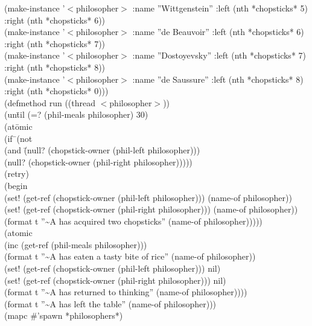 \documentclass[10pt]{book}
\newenvironment{lisp}{\begin{ttfamily}\begin{tabbing}}{\par\end{tabbing}\end{ttfamily}}
\begin{document}
\begin{lisp}
\>  (make-instance '$<$philosopher$>$ :name ''Wittgenstein'' :left (nth *chopsticks* 5) :right (nth *chopsticks* 6))\\
\>  (make-instance '$<$philosopher$>$ :name ''de Beauvoir'' :left (nth *chopsticks* 6) :right (nth *chopsticks* 7))\\
\>  (make-instance '$<$philosopher$>$ :name  ''Dostoyevsky'' :left (nth *chopsticks* 7) :right (nth *chopsticks* 8))\\ 
\>  (make-instance '$<$philosopher$>$ :name ''de Saussure'' :left (nth *chopsticks* 8) :right (nth *chopsticks* 0)))\\
(defmethod run ((thread $<$philosopher$>$))\\
\> (un\= til (=? (phil-meals philosopher) 30)\\ %
\> \> (at\= omic \\
\> \> \> (if\=\ (not \\
\> \> \> \> (and \= (null? (chopstick-owner (phil-left philosopher))) \\
\> \> \> \> \> (null? (chopstick-owner (phil-right philosopher)))))\\
\> \> \> \> (retry)\\ %
\> \> \> \> (begin\\
\> \> \> \> \> (set! (get-ref (chopstick-owner (phil-left philosopher))) (name-of philosopher))\\
\> \> \> \> \> (set! (get-ref (chopstick-owner (phil-right philosopher))) (name-of philosopher))\\
\> \> \> \> \> (format t ''\textasciitilde A has acquired two chopsticks''  (name-of philosopher)))))\\
\> \> (atomic\\
\> \> \> (inc (get-ref (phil-meals philosopher)))\\
\> \> \> (format t ''\textasciitilde A has eaten a tasty bite of rice'' (name-of philosopher))\\
\> \> \> (set! (get-ref (chopstick-owner (phil-left philosopher))) nil) \\
\> \> \> (set! (get-ref (chopstick-owner (phil-right philosopher))) nil)\\
\> \> \> (format t ''\textasciitilde A has returned to thinking'' (name-of philosopher))))\\
\> (format t ''\textasciitilde A has left the table'' (name-of philosopher)))\\
(mapc \#'spawn *philosophers*)
\end{lisp}
\end{document}
